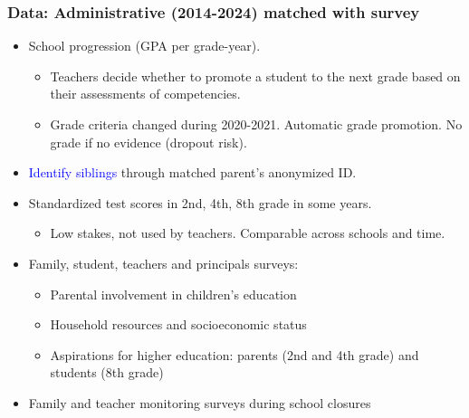 \documentclass{beamer}
\begin{document}
\begin{frame}
    
    \label{frame:data}
    \frametitle{Data: Administrative (2014-2024) matched with survey}

    \begin{itemize}
        \item School progression (GPA per grade-year). 
        \begin{itemize}
            \item Teachers decide whether to promote a student to the next grade based on their assessments of competencies.
            \item Grade criteria changed during 2020-2021. Automatic grade promotion. No grade if no evidence (dropout risk).
        \end{itemize}
        \item \textcolor{blue}{Identify siblings} through matched parent's anonymized ID.
        \item Standardized test scores in 2nd, 4th, 8th grade in some years. 
        \begin{itemize}
            \item Low stakes, not used by teachers. Comparable across schools and time.
        \end{itemize}
        \item Family, student, teachers and principals surveys:
        \begin{itemize}
            \item Parental involvement in children's education
            \item Household resources and socioeconomic status
            \item Aspirations for higher education: parents (2nd and 4th grade) and students (8th grade)
        \end{itemize}
        \item Family and teacher monitoring surveys during school closures
    \end{itemize}
\end{frame}
\end{document}
